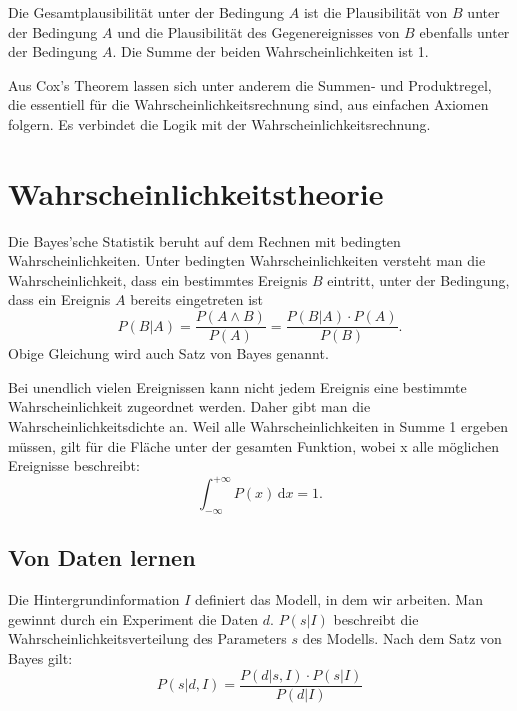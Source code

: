 \documentclass[]{dsadokumentation}
\begin{document}
Die Gesamtplausibilität unter der Bedingung $A$ ist die Plausibilität von $B$ unter der Bedingung $A$
und die Plausibilität des Gegenereignisses von $B$ ebenfalls unter der Bedingung $A$. Die Summe der beiden Wahrscheinlichkeiten ist 1.

Aus Cox's Theorem lassen sich unter anderem die Summen- und Produktregel, die essentiell für die Wahrscheinlichkeitsrechnung sind, aus einfachen Axiomen folgern.
Es verbindet die Logik mit der Wahrscheinlichkeitsrechnung.

\section{Wahrscheinlichkeitstheorie}\label{k4.2.bayes}

Die Bayes'sche Statistik beruht auf dem Rechnen mit bedingten Wahrscheinlichkeiten. Unter bedingten Wahrscheinlichkeiten versteht man die Wahrscheinlichkeit, dass ein bestimmtes Ereignis $B$ eintritt, unter der Bedingung, dass ein Ereignis $A$ bereits eingetreten ist
\begin{displaymath}
P(B|A) = \frac{P(A \wedge B)}{P(A)} = \frac{P(B|A)\cdot P(A)}{P(B)}.
\end{displaymath}
Obige Gleichung wird auch Satz von Bayes genannt.

Bei unendlich vielen Ereignissen kann nicht jedem Ereignis eine bestimmte Wahrscheinlichkeit zugeordnet werden. Daher gibt man die Wahrscheinlichkeitsdichte an. Weil alle Wahrscheinlichkeiten in Summe 1 ergeben müssen, gilt für die Fläche unter der gesamten Funktion, wobei x alle möglichen Ereignisse beschreibt:
\begin{displaymath}
\int_{- \infty }^ {+ \infty} P(x) \,\mbox{d}x = 1.
\end{displaymath}


\subsection{Von Daten lernen}
 Die Hintergrundinformation $I$ definiert das Modell, in dem wir arbeiten. Man gewinnt durch ein Experiment die Daten $d$. $P(s|I)$ beschreibt die Wahrscheinlichkeitsverteilung des Parameters $s$ des Modells. Nach dem Satz von Bayes gilt:
\begin{displaymath}
P(s|d,I) = \frac{P(d|s,I)\cdot P(s|I)}{P(d|I)}
\end{displaymath}
\end{document}
